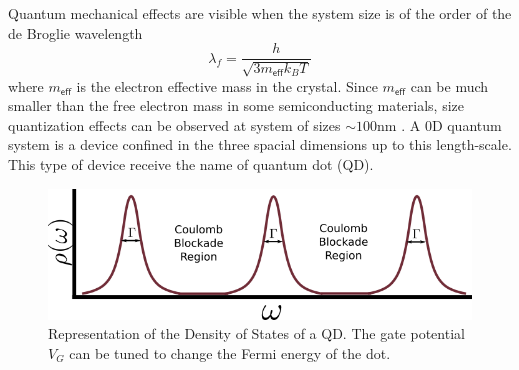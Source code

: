 Quantum mechanical effects are visible when the system size is of the order of the de Broglie wavelength \citep[(1.1)]{bimberg_quantum_1999}
\[
\lambda_{f}=\frac{h}{\sqrt{3m_{\mathsf{eff}}k_{B}T}}
\]
 where $m_{\mathsf{eff}}$ is the electron effective mass in the crystal. Since $m_{\mathsf{eff}}$ can be much smaller than the free electron mass in some semiconducting materials, size quantization effects can be observed at system of sizes $\sim100\mbox{nm}$ \cite{sindel_numerical_2005}. A $0$D quantum system is a device confined in the three spacial dimensions up to this length-scale. This type of device receive the name of quantum dot (QD). 

\begin{figure}[tb]
    \centering
    \includegraphics[scale=0.5]{IMAGES/Preliminars/specDot.png}
    \caption{Representation of the Density of States of a QD. The gate potential $V_G$ can be tuned to change the Fermi energy of the dot. 
    \label{fig:specDots}}
\end{figure}


